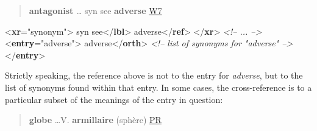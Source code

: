 \begin{quote}{\bfseries antagonist} … syn see {\bfseries adverse} \hyperref[DIC-W7]{W7}\end{quote}
 \par\bgroup{}\exampleFont \begin{shaded}\noindent\mbox{}{<\textbf{xr}\hspace*{1em}{type}="{synonym}">}\mbox{}\newline 
{}syn see{</\textbf{lbl}>}\mbox{}\newline 
{}adverse{</\textbf{ref}>}\mbox{}\newline 
{</\textbf{xr}>}\mbox{}\newline 
\textit{<!-- ... -->}\mbox{}\newline 
{<\textbf{entry}\hspace*{1em}{xml:id}="{adverse}">}\mbox{}\newline 
{}\mbox{}\newline 
\hspace*{1em}adverse{</\textbf{orth}>}\mbox{}\newline 
{}\mbox{}\newline 
\textit{<!-- list of synonyms  for "adverse"  -->}\mbox{}\newline 
{</\textbf{entry}>}\end{shaded}\egroup\par \noindent Strictly speaking, the reference above is not to the entry for \textit{adverse}, but to the list of synonyms found within that entry.   In some cases, the cross-reference is to a particular subset of the meanings of the entry in question:
\begin{quote}{\bfseries globe} …V. {\bfseries armillaire} (sphère) \hyperref[DIC-PR]{PR}\end{quote}
